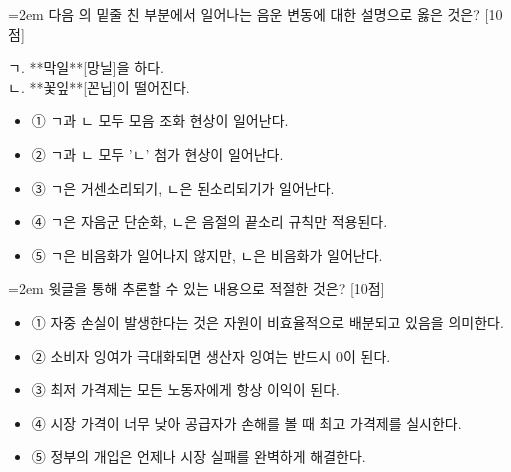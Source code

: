 \documentclass[10pt,a4paper]{article}
\newcommand{\qnum}[1]{%
  \tikz[baseline=(num.base)]{%
    \node[circle, fill=numCircle, text=white, inner sep=0pt,
          minimum size=18pt, font=\small\bfseries] (num) {#1};%
  }%
}
\newcommand{\pts}[1]{%
  \hfill\textcolor{ptsBadge}{[#1점]}%
}
\begin{document}
\vspace{4mm}
\begin{minipage}{\columnwidth}
{\hangindent=2em
\qnum{13}\enspace 다음 의 밑줄 친 부분에서 일어나는 음운 변동에 대한 설명으로 옳은 것은? \pts{10}
\par}

\vspace{3mm}
\begin{tcolorbox}[bogi]
ㄱ. **막일**[망닐]을 하다. \\{}
ㄴ. **꽃잎**[꼰닙]이 떨어진다.
\end{tcolorbox}
\vspace{3mm}
\begin{itemize}[leftmargin=2.5em, labelsep=0.3em, label={}, itemsep=4pt, parsep=1pt, topsep=0pt]
  \item ① ㄱ과 ㄴ 모두 모음 조화 현상이 일어난다.
  \item ② ㄱ과 ㄴ 모두 'ㄴ' 첨가 현상이 일어난다.
  \item ③ ㄱ은 거센소리되기, ㄴ은 된소리되기가 일어난다.
  \item ④ ㄱ은 자음군 단순화, ㄴ은 음절의 끝소리 규칙만 적용된다.
  \item ⑤ ㄱ은 비음화가 일어나지 않지만, ㄴ은 비음화가 일어난다.
\end{itemize}
\end{minipage}
\vspace{4mm}

\vspace{4mm}
\begin{minipage}{\columnwidth}
{\hangindent=2em
\qnum{14}\enspace 윗글을 통해 추론할 수 있는 내용으로 적절한 것은? \pts{10}
\par}

\vspace{3mm}
\begin{itemize}[leftmargin=2.5em, labelsep=0.3em, label={}, itemsep=4pt, parsep=1pt, topsep=0pt]
  \item ① 자중 손실이 발생한다는 것은 자원이 비효율적으로 배분되고 있음을 의미한다.
  \item ② 소비자 잉여가 극대화되면 생산자 잉여는 반드시 0이 된다.
  \item ③ 최저 가격제는 모든 노동자에게 항상 이익이 된다.
  \item ④ 시장 가격이 너무 낮아 공급자가 손해를 볼 때 최고 가격제를 실시한다.
  \item ⑤ 정부의 개입은 언제나 시장 실패를 완벽하게 해결한다.
\end{itemize}
\end{minipage}
\vspace{4mm}
\end{document}
